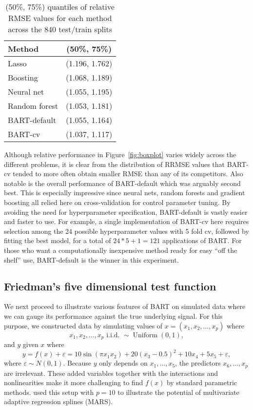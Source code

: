 \documentclass[aoas,nameyear,dvips]{arximspdf}
\let\epsilon\varepsilon
\newcommand{\citeasnoun}[1]{\citet{#1}}
\begin{document}
\begin{table}
\tablewidth=170pt
\caption{(50\%, 75\%) quantiles of relative RMSE values for each method across the 840 test/train splits}\label{tab:perf}
\begin{tabular*}{170pt}{@{\extracolsep{\fill}}lc@{}}
\hline
\textbf{Method}         &   \textbf{(50\%, 75\%)}     \\
\hline
Lasso         & (1.196, 1.762)\\
Boosting      & (1.068, 1.189)\\
Neural net    & (1.055, 1.195)\\
Random forest & (1.053, 1.181)\\
BART-default  & (1.055, 1.164)\\
BART-cv       & (1.037, 1.117)\\
\hline
\end{tabular*}
\end{table}

Although relative performance in Figure~\ref{fig:boxplot} varies widely across the different problems, it is clear from the distribution of RRMSE values  that BART-cv tended to more often obtain smaller RMSE than any of its competitors.   Also notable is the overall performance of BART-default which was arguably second best.  This is especially impressive since neural nets, random forests and gradient boosting all relied here on cross-validation for control parameter tuning.   By avoiding the need for hyperparameter specification, BART-default is vastly easier and faster to use. For example, a single implementation of BART-cv here requires
selection among the 24 possible hyperparameter values with 5 fold cv,
followed by fitting the best model, for a total of $24*5 + 1 = 121$
applications of BART.  For those who want a computationally inexpensive method ready for
easy ``off the shelf'' use, BART-default is the winner in this experiment.


\subsection{Friedman's five dimensional test function}\label{sec:simex:friedman}


We next proceed to illustrate various features of BART on simulated data where
we can gauge its performance against the true underlying signal. For this purpose,
we  constructed  data by
simulating values of $x = (x_1,x_2,\ldots,x_p)$ where
\begin{equation}\label{eq:fri-xs}
x_1,x_2,\ldots,x_p \mbox{  i.i.d. } \sim \operatorname{Uniform}(0,1),
\end{equation}
and $y$ given $x$ where
\begin{equation}\label{eq:fri-ys}
y = f(x) + \epsilon = 10 \sin(\pi x_1 x_2) + 20 (x_3-0.5)^2 + 10
x_4 + 5 x_5 + \epsilon,
\end{equation}
where $\epsilon \sim N(0,1)$.  Because $y$ only depends on
$x_1,\ldots,x_5$, the predictors $x_6,\ldots, x_p$ are irrelevant.
These added variables together with the interactions and
nonlinearities make it more challenging to find $f(x)$ by
standard parametric methods.  \citeasnoun{Frie1991} used this setup
with $p = 10$ to illustrate the potential of
multivariate adaptive regression
splines (MARS).
\end{document}
